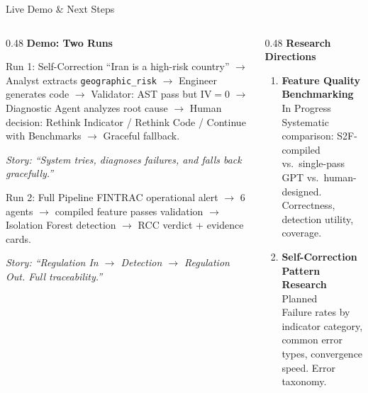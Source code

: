 \documentclass[10pt, aspectratio=169]{beamer}
\newcommand{\hlg}[1]{\textcolor{accentgreen}{#1}}
\newcommand{\hlo}[1]{\textcolor{accentorange}{#1}}
\begin{document}
\begin{frame}{Live Demo \& Next Steps}

\begin{columns}[T]
\begin{column}{0.48\textwidth}
  \textbf{Demo: Two Runs}
  \vspace{0.3em}

  \begin{alertblock}{Run 1: Self-Correction}
    \scriptsize
    ``Iran is a high-risk country'' \(\to\) Analyst extracts \texttt{geographic\_risk} \(\to\) Engineer generates code \(\to\) Validator: AST pass but IV\(=0\) \(\to\) Diagnostic Agent analyzes root cause \(\to\) Human decision: Rethink Indicator / Rethink Code / Continue with Benchmarks \(\to\) Graceful fallback.

    \vspace{0.3em}
    \textit{Story: ``System tries, diagnoses failures, and falls back gracefully.''}
  \end{alertblock}

  \vspace{0.3em}
  \begin{exampleblock}{Run 2: Full Pipeline}
    \scriptsize
    FINTRAC operational alert \(\to\) 6 agents \(\to\) compiled feature passes validation \(\to\) Isolation Forest detection \(\to\) RCC verdict + evidence cards.

    \vspace{0.3em}
    \textit{Story: ``Regulation In \(\to\) Detection \(\to\) Regulation Out. Full traceability.''}
  \end{exampleblock}
\end{column}

\begin{column}{0.48\textwidth}
  \textbf{Research Directions}
  \vspace{0.3em}

  \scriptsize
  \begin{enumerate}\itemsep0.5em
    \item \textbf{Feature Quality Benchmarking} {\tiny\hlg{In Progress}}\\
      Systematic comparison: S2F-compiled vs.\ single-pass GPT vs.\ human-designed. Correctness, detection utility, coverage.

    \item \textbf{Self-Correction Pattern Research} {\tiny\hlo{Planned}}\\
      Failure rates by indicator category, common error types, convergence speed. Error taxonomy.


\end{enumerate}
\end{column}
\end{columns}
\end{frame}
\end{document}
